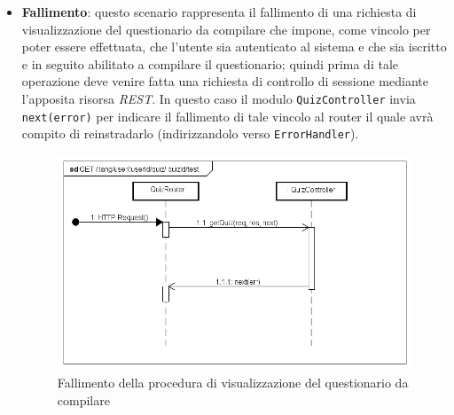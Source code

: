 \begin{itemize}
\item \textbf{Fallimento}: questo scenario rappresenta il fallimento di una richiesta di visualizzazione del questionario da compilare che impone, come vincolo per poter essere effettuata, che l'utente sia autenticato al sistema e che sia iscritto e in seguito abilitato a compilare il questionario; quindi prima di tale operazione deve venire fatta una richiesta di controllo di sessione mediante l'apposita risorsa \textit{REST}. In questo caso il modulo \texttt{QuizController} invia \texttt{next(error)} per indicare il fallimento di tale vincolo al router il quale avrà compito di reinstradarlo (indirizzandolo verso \texttt{ErrorHandler}).
\label{Fallimento della procedura di visualizzazione del questionario da compilare}
\begin{figure}[ht]
	\centering
	\includegraphics[scale=0.40]{UML/DiagrammiDiSequenza/Back-end/GET__lang_user_userId_quiz_quizId_test_failure.png}
	\caption{Fallimento della procedura di visualizzazione del questionario da compilare}
\end{figure}
\FloatBarrier
\end{itemize}


